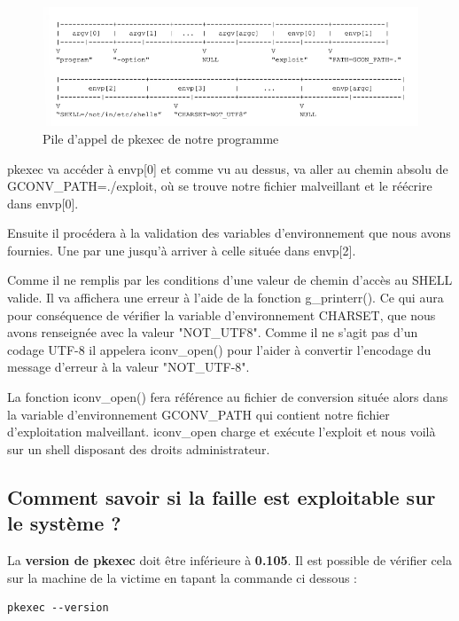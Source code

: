 \documentclass[12pt,a4paper]{article}
\begin{document}
\begin{flushleft}
\begin{enumerate}
            \end{enumerate}
            \begin{center}
                \begin{figure}
                    \caption{Pile d'appel de pkexec de notre programme \cite{CVE2021425:online}}
                    \includegraphics[scale=0.5]{pile d'appel programme final} 
                 \end{figure}
            \end{center}
            \item pkexec va accéder à envp[0] et comme vu au dessus, va aller au chemin absolu de GCONV\_PATH=./exploit, où se trouve notre fichier malveillant et le réécrire dans envp[0].
            \item Ensuite il procédera à la validation des variables d'environnement que nous avons fournies. Une par une jusqu'à arriver à celle située dans envp[2].
            \item Comme il ne remplis par les conditions d'une valeur de chemin d'accès au SHELL valide. Il va affichera une erreur à l'aide de la fonction g\_printerr(). Ce qui aura pour conséquence de vérifier la variable d'environnement CHARSET, que nous avons renseignée avec la valeur "NOT\_UTF8". Comme il ne s'agit pas d'un codage UTF-8 il appelera iconv\_open() pour l'aider à convertir l'encodage du message d'erreur à la valeur "NOT\_UTF-8".
            \item La fonction iconv\_open() fera référence au fichier de conversion située alors dans la variable d'environnement GCONV\_PATH qui contient notre fichier d'exploitation malveillant. iconv\_open charge et exécute l'exploit et nous voilà sur un shell disposant des droits administrateur.
             
   		\subsection{Comment savoir si la faille est exploitable sur le système ?}
   		La \textbf{version de pkexec} doit être inférieure à \textbf{0.105}. Il est possible de vérifier cela sur la machine de la victime en tapant la commande ci dessous : 
\begin{lstlisting}
pkexec --version
\end{lstlisting}
    \end{flushleft}
    \newpage
\end{document}
